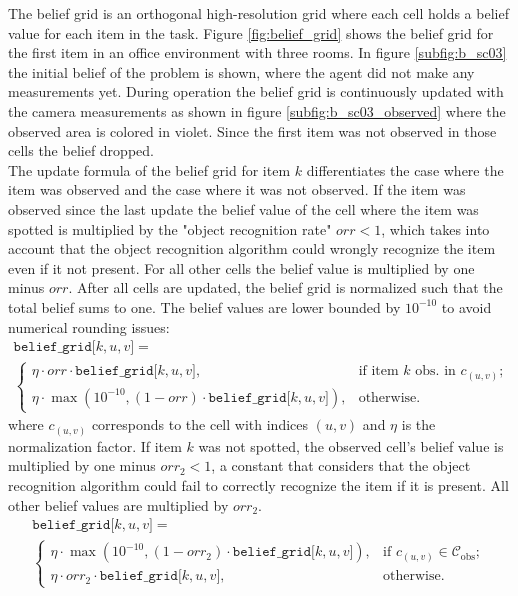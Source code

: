 The belief grid is an orthogonal high-resolution grid where each cell holds a belief value for each item in the task. Figure \ref{fig:belief_grid} shows the belief grid for the first item in an office environment with three rooms. In figure \ref{subfig:b_sc03} the initial belief of the problem is shown, where the agent did not make any measurements yet. During operation the belief grid is continuously updated with the camera measurements as shown in figure \ref{subfig:b_sc03_observed} where the observed area is colored in violet. Since the first item was not observed in those cells the belief dropped.\\
The update formula of the belief grid for item $k$ differentiates the case where the item was observed and the case where it was not observed. If the item was observed since the last update the belief value of the cell where the item was spotted is multiplied by the "object recognition rate" $orr<1$, which takes into account that the object recognition algorithm could wrongly recognize the item even if it not present. For all other cells the belief value is multiplied by one minus $orr$. After all cells are updated, the belief grid is normalized such that the total belief sums to one. The belief values are lower bounded by $10^{-10}$ to avoid numerical rounding issues: 
%
\begin{multline}\label{eq:belief_grid1}
    \texttt{belief\_grid[$k, u, v$]} =\\ 
    \begin{cases} 
        \eta \cdot orr \cdot \texttt{belief\_grid[$k, u, v$]}, &\text{if item $k$ obs. in }c_{(u,v)}; \\
        \eta \cdot \max\left(10^{-10}, (1 - orr) \cdot \texttt{belief\_grid[$k, u, v$]}\right), &\text{otherwise}.
    \end{cases}
\end{multline}
% 
where $c_{(u,v)}$ corresponds to the cell with indices $(u,v)$ and $\eta$ is the normalization factor.
If item $k$ was not spotted, the observed cell's belief value is multiplied by one minus $orr_2<1$, a constant that considers that the object recognition algorithm could fail to correctly recognize the item if it is present. All other belief values are multiplied by $orr_2$. 
%
\begin{multline}\label{eq:belief_grid2}
    \texttt{belief\_grid[$k, u, v$]} =\\ 
    \begin{cases} 
        \eta \cdot\max\left(10^{-10}, (1 -  orr_2) \cdot \texttt{belief\_grid[$k, u, v$]}\right), &\text{if }c_{(u,v)} \in \mathcal{C}_\text{obs};\\
        \eta \cdot orr_2 \cdot \texttt{belief\_grid[$k, u, v$]}, &\text{otherwise.}
    \end{cases}
\end{multline}
